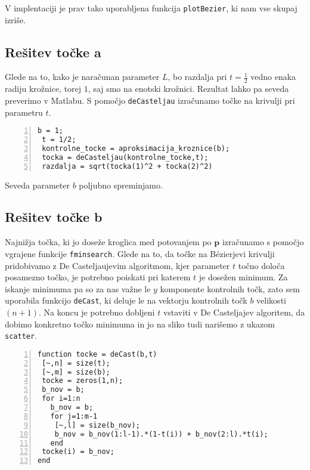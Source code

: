 \documentclass[a4paper,12pt]{article}
\begin{document}
	\noindent V implentaciji je prav tako uporabljena funkcija \lstinline[style=Matlab-editor]!plotBezier!, ki nam vse skupaj izriše.
	
	\subsection{Rešitev točke a}

	Glede na to, kako je naračunan parameter $L$, bo razdalja pri $t=\frac{1}{2}$ vedno enaka radiju krožnice, torej $1$, saj smo na enotski
	krožnici. Rezultat lahko pa seveda preverimo v Matlabu. S pomočjo \lstinline[style=Matlab-editor]!deCasteljau! izračunamo točke na krivulji pri
	parametru $t$.

	\begin{lstlisting}[style=Matlab-editor,	numbers=left,]
 b = 1;
 t = 1/2;
 kontrolne_tocke = aproksimacija_kroznice(b);
 tocka = deCasteljau(kontrolne_tocke,t);
 razdalja = sqrt(tocka(1)^2 + tocka(2)^2)
	\end{lstlisting}

	\noindent Seveda parameter $b$ poljubno spreminjamo. 

	\subsection{Rešitev točke b}
	Najnižja točka, ki jo doseže kroglica med potovanjem po $\boldsymbol{p}$ izračunamo s pomočjo vgrajene funkcije \lstinline[style=Matlab-editor]!fminsearch!. Glede na to, da točke na 
	B\'ezierjevi krivulji pridobivamo z De Casteljaujevim algoritmom, kjer parameter $t$ točno določa posamezno točko, je potrebno poiskati pri katerem $t$ je dosežen minimum. Za iskanje minimuma pa so
	za nas važne le $y$ komponente kontrolnih točk, zato sem uporabila funkcijo \lstinline[style=Matlab-editor]!deCast!, ki deluje le na vektorju kontrolnih točk $b$ velikosti $(n+1)$. Na koncu je potrebno dobljeni $t$ vstaviti v  
	De Casteljajev algoritem, da dobimo konkretno točko minimuma in jo na sliko tudi narišemo z ukazom \lstinline[style=Matlab-editor]!scatter!.

	\begin{lstlisting}[style=Matlab-editor,	numbers=left,]
function tocke = deCast(b,t)
 [~,n] = size(t);
 [~,m] = size(b);
 tocke = zeros(1,n);
 b_nov = b;
 for i=1:n
   b_nov = b;
   for j=1:m-1
    [~,l] = size(b_nov);
    b_nov = b_nov(1:l-1).*(1-t(i)) + b_nov(2:l).*t(i);
   end
 tocke(i) = b_nov;
end
\end{lstlisting}
\end{document}
